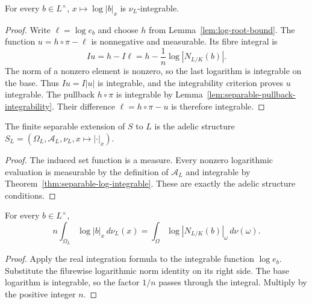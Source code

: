 \begin{theorem}\label{thm:separable-log-integrable}
\leanok
{}
For every $b\in L^\times$, $x\mapsto\log|b|_x$ is $\nu_L$-integrable.
\end{theorem}
\begin{proof}
Write $\ell=\log e_b$ and choose $h$ from Lemma~\ref{lem:log-root-bound}.
The function $u=h\circ\pi-\ell$ is nonnegative and measurable. Its fibre
integral is
\[
 Iu=h-I\ell=h-\frac1n\log|N_{L/K}(b)|.
\]
The norm of a nonzero element is nonzero, so the last logarithm is
integrable on the base. Thus $Iu=I|u|$ is integrable, and the integrability
criterion proves $u$ integrable. The pullback $h\circ\pi$ is integrable
by Lemma~\ref{lem:separable-pullback-integrability}. Their difference
$\ell=h\circ\pi-u$ is therefore integrable.
\end{proof}

\begin{definition}\label{def:separable-extension}
\leanok
{}
The finite separable extension of $S$ to $L$ is the adelic structure
$S_L=(\Omega_L,\mathcal A_L,\nu_L,x\mapsto|\cdot|_x)$.
\end{definition}
\begin{proof}
The induced set function is a measure. Every nonzero logarithmic evaluation
is measurable by the definition of $\mathcal A_L$ and integrable by
Theorem~\ref{thm:separable-log-integrable}. These are exactly the adelic
structure conditions.
\end{proof}

\begin{proposition}\label{prop:separable-norm-integral}
\leanok
{}
For every $b\in L^\times$,
\[
 n\int_{\Omega_L}\log|b|_x\,d\nu_L(x)
 =\int_\Omega\log|N_{L/K}(b)|_\omega\,d\nu(\omega).
\]
\end{proposition}
\begin{proof}
Apply the real integration formula to the integrable function $\log e_b$.
Substitute the fibrewise logarithmic norm identity on its right side.
The base logarithm is integrable, so the factor $1/n$ passes through
the integral. Multiply by the positive integer $n$.
\end{proof}

